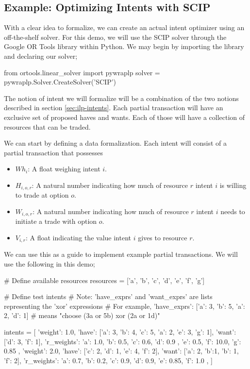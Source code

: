 
\subsection{Example: Optimizing Intents with SCIP}\label{sec:scip-example}

With a clear idea to formalize, we can create an actual intent optimizer using an off-the-shelf solver. For this demo, we will use the SCIP solver through the Google OR Tools library within Python. We may begin by importing the library and declaring our solver;

\begin{betterpython}
from ortools.linear_solver import pywraplp
solver = pywraplp.Solver.CreateSolver('SCIP')
\end{betterpython}

The notion of intent we will formalize will be a combination of the two notions described in section \ref{sec:ilp-intents}. Each partial transaction will have an exclusive set of proposed haves and wants. Each of those will have a collection of resources that can be traded.

We can start by defining a data formalization. Each intent will consist of a partial transaction that possesses

\begin{itemize}
    \item $Wh_i$: A float weighing intent $i$.
    \item $H_{i, o, r}$: A natural number indicating how much of resource $r$ intent $i$ is willing to trade at option $o$.
    \item $W_{i, o, r}$: A natural number indicating how much of resource $r$ intent $i$ needs to initiate a trade with option $o$.
    \item $V_{i, r}$: A float indicating the value intent $i$ gives to resource $r$.
\end{itemize}

We can use this as a guide to implement example partial transactions. We will use the following in this demo;

\begin{betterpython}
# Define available resources
resources = ['a', 'b', 'c', 'd', 'e', 'f', 'g']

# Define test intents
# Note: 'have_exprs' and 'want_exprs' are lists representing the 'xor' expressions
# For example, 'have_exprs': [{'a': 3, 'b': 5}, {'a': 2, 'd': 1}] 
# means "choose (3a or 5b) xor (2a or 1d)"

intents = [
    {'weight': 1.0, 
     'have': [{'a': 3, 'b': 4, 'c': 5}, {'a': 2}, {'e': 3, 'g': 1}],
     'want': [{'d': 3}, {'f': 1}],
     'r_weights': { 'a': 1.0, 'b': 0.5, 'c': 0.6, 'd': 0.9
                  , 'e': 0.5, 'f': 10.0, 'g': 0.85}
     },
    {'weight': 2.0, 
     'have': [{'c': 2, 'd': 1}, {'e': 4}, {'f': 2}],
     'want': [{'a': 2, 'b':1}, {'b': 1, 'f': 2}],
     'r_weights': { 'a': 0.7, 'b': 0.2, 'c': 0.9, 'd': 0.9, 'e': 0.85, 'f': 1.0}
    },
]
\end{betterpython}

